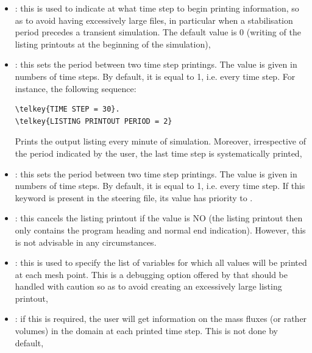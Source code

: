 \begin{itemize}

\item {}:
this is used to indicate at what time step to begin printing information,
so as to avoid having excessively large files,
in particular when a stabilisation period precedes a transient simulation.
The default value is 0 (writing of the listing printouts at the
beginning of the simulation),

\item {}:
this sets the period between two time step printings.
The value is given in numbers of time steps.
By default, it is equal to 1, i.e. every time step.
For instance, the following sequence:

\begin{lstlisting}[language=TelemacCas]
\telkey{TIME STEP = 30}.
\telkey{LISTING PRINTOUT PERIOD = 2}
\end{lstlisting}

Prints the output listing every minute of simulation.
Moreover, irrespective of the period indicated by the user,
the last time step is systematically printed,

\item {}:
this sets the period between two time step printings.
The value is given in numbers of time steps.
By default, it is equal to 1, i.e. every time step.
If this keyword is present in the steering file,
its value has priority to .

\item {}:
this cancels the listing printout if the value is NO
(the listing printout then only contains the program heading and normal end
indication).
However, this is not advisable in any circumstances.

\item {}:
this is used to specify the list of variables for which all values
will be printed at each mesh point.
This is a debugging option offered by  that should be handled
with caution so as to avoid creating an excessively large listing printout,

\item {}:
if this is required, the user will get information on the mass fluxes
(or rather volumes) in the domain at each printed time step.
This is not done by default,


\end{itemize}

